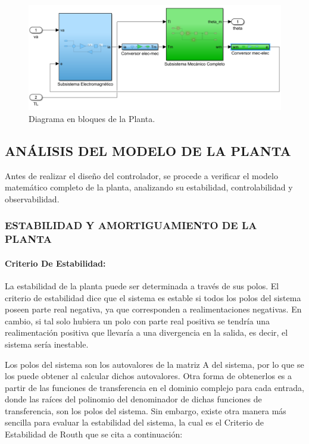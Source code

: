 \documentclass{article}
\begin{document}
\begin{sloppypar}
\begin{figure}[H]
    \centering
    \includegraphics[width=1\textwidth] {Diagrama en bloques de la Planta}
    \caption{Diagrama en bloques de la Planta.}
    \label{fig:Diagrama en bloques de la Planta}
\end{figure}


\subsection{ANÁLISIS DEL MODELO DE LA PLANTA}
\label{sec:ANÁLISIS DEL MODELO DE LA PLANTA}

Antes de realizar el diseño del controlador, se procede a verificar el modelo matemático completo de la planta, analizando su estabilidad, controlabilidad y observabilidad.

\subsubsection{ESTABILIDAD Y AMORTIGUAMIENTO DE LA PLANTA}
\label{sec:ESTABILIDAD Y AMORTIGUAMIENTO DE LA PLANTA}

\paragraph{Criterio De Estabilidad:}
\label{sec:Criterio De Estabilidad:}
\hfill

\hfill

La estabilidad de la planta puede ser determinada a través de sus polos. El criterio de estabilidad dice que el sistema es estable si todos los polos del sistema poseen parte real negativa, ya que corresponden a realimentaciones negativas. En cambio, si tal solo hubiera un polo con parte real positiva se tendría una realimentación positiva que llevaría a una divergencia en la salida, es decir, el sistema sería inestable.

Los polos del sistema son los autovalores de la matriz A del sistema, por lo que se los puede obtener al calcular dichos autovalores.
Otra forma de obtenerlos es a partir de las funciones de transferencia en el dominio complejo para cada entrada, donde las raíces del polinomio del denominador de dichas funciones de transferencia, son los polos del sistema.
Sin embargo, existe otra manera más sencilla para evaluar la estabilidad del sistema, la cual es el Criterio de Estabilidad de Routh que se cita a continuación:


\end{sloppypar}
\end{document}
